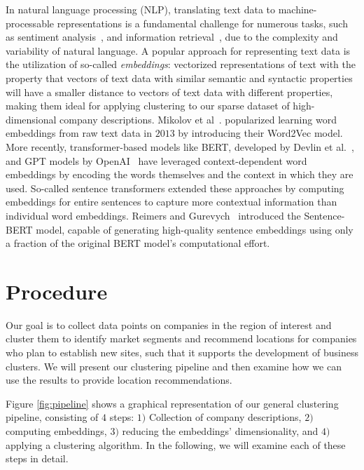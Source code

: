 \documentclass[12pt]{article}
\begin{document}
   In natural language processing (NLP), translating text data to machine-processable representations is a fundamental challenge for numerous tasks, such as sentiment analysis~\cite{rezaeinia2019sentiment}, and information retrieval~\cite{ye2016word}, due to the complexity and variability of natural language. A popular approach for representing text data is the utilization of so-called \emph{embeddings}: vectorized representations of text with the property that vectors of text data with similar semantic and syntactic properties will have a smaller distance to vectors of text data with different properties, making them ideal for applying clustering to our sparse dataset of high-dimensional company descriptions.  
   Mikolov et al~\cite{mikolov2013efficient}. popularized learning word embeddings from raw text data in $2013$ by introducing their Word2Vec model. More recently, transformer-based models like BERT, developed by Devlin et al.~\cite{devlin2018bert}, and GPT models by OpenAI~\cite{radford2018improving, chatgpt} have leveraged context-dependent word embeddings by encoding the words themselves and the context in which they are used. So-called sentence transformers extended these approaches by computing embeddings for entire sentences to capture more contextual information than individual word embeddings. Reimers and Gurevych~\cite{reimers2019sentence} introduced the Sentence-BERT model, capable of generating high-quality sentence embeddings using only a fraction of the original BERT model's computational effort.
   
   \section{Procedure}
   
   Our goal is to collect data points on companies in the region of interest and cluster them to identify market segments and recommend locations for companies who plan to establish new sites, such that it supports the development of business clusters. We will present our clustering pipeline and then examine how we can use the results to provide location recommendations. 
   
   Figure \ref{fig:pipeline} shows a graphical representation of our general clustering pipeline, consisting of $4$ steps: $1)$ Collection of company descriptions, $2)$ computing embeddings, $3)$ reducing the embeddings' dimensionality, and $4)$ applying a clustering algorithm. In the following, we will examine each of these steps in detail.
   
\end{document}
